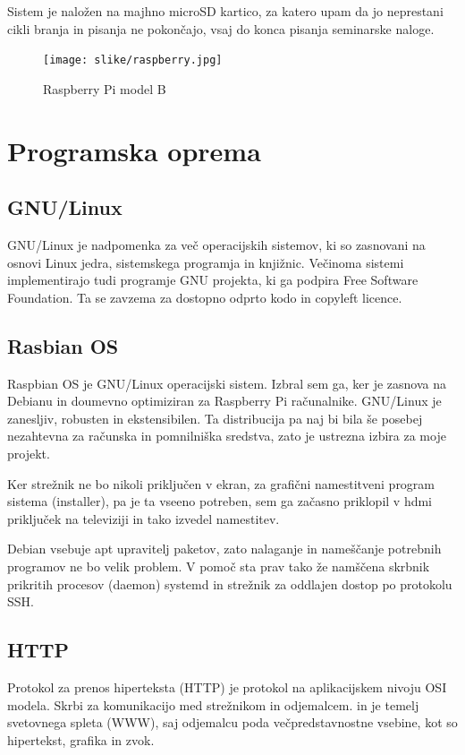 \documentclass[12pt, a4paper]{article}
\begin{document}
Sistem je naložen na majhno microSD kartico, za katero upam da jo neprestani cikli branja in pisanja ne pokončajo, vsaj do konca pisanja seminarske naloge.
\begin{figure}[h]
	\centering
	\texttt{[image: slike/raspberry.jpg]}
	\caption{Raspberry Pi model B}
	\label{fig:raspberry}
\end{figure}

\section{Programska oprema}
\subsection{GNU/Linux}
GNU/Linux je nadpomenka za več operacijskih sistemov, ki so zasnovani na osnovi Linux jedra, sistemskega programja in knjižnic.\cite{linux}
Večinoma sistemi implementirajo tudi programje GNU projekta, ki ga podpira Free Software Foundation.
Ta se zavzema za dostopno odprto kodo in copyleft licence.\cite{gnu} 
\subsection{Rasbian OS}
Raspbian OS je GNU/Linux operacijski sistem. Izbral sem ga, ker je zasnova na Debianu in doumevno optimiziran za Raspberry Pi računalnike.
GNU/Linux je zanesljiv, robusten in ekstensibilen.
Ta distribucija pa naj bi bila še posebej nezahtevna za računska in pomnilniška sredstva\cite{raspbian}, zato je ustrezna izbira za moje projekt.

Ker strežnik ne bo nikoli priključen v ekran, za grafični namestitveni program sistema (installer), pa je ta vseeno potreben, sem ga začasno priklopil v hdmi priključek na televiziji in tako izvedel namestitev.

Debian vsebuje apt upravitelj paketov, zato nalaganje in nameščanje potrebnih programov ne bo velik problem.
V pomoč sta prav tako že namščena skrbnik prikritih procesov (daemon) systemd in strežnik za oddlajen dostop po protokolu SSH. 

\subsection{HTTP}
Protokol za prenos hiperteksta (HTTP) je protokol na aplikacijskem nivoju OSI modela.
Skrbi za komunikacijo med strežnikom in odjemalcem.\cite{HTTP} in je temelj svetovnega spleta (WWW), saj odjemalcu poda večpredstavnostne vsebine, kot so hipertekst, grafika in zvok.  
\end{document}
